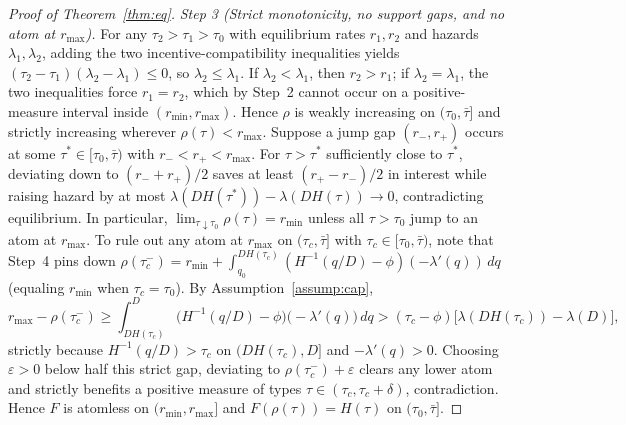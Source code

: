 \begin{proof}[Proof of Theorem~\ref{thm:eq}]
\emph{Step 3 (Strict monotonicity, no support gaps, and no atom at $r_{\max}$).} For any $\tau_2 > \tau_1 > \tau_0$ with equilibrium rates $r_1, r_2$ and hazards $\lambda_1, \lambda_2$, adding the two incentive-compatibility inequalities yields $(\tau_2 - \tau_1)(\lambda_2 - \lambda_1) \le 0$, so $\lambda_2 \le \lambda_1$. If $\lambda_2 < \lambda_1$, then $r_2 > r_1$; if $\lambda_2 = \lambda_1$, the two inequalities force $r_1 = r_2$, which by Step~2 cannot occur on a positive-measure interval inside $(r_{\min}, r_{\max})$. Hence $\rho$ is weakly increasing on $(\tau_0, \bar{\tau}]$ and strictly increasing wherever $\rho(\tau) < r_{\max}$. Suppose a jump gap $(r_-, r_+)$ occurs at some $\tau^* \in [\tau_0, \bar{\tau})$ with $r_- < r_+ < r_{\max}$. For $\tau > \tau^*$ sufficiently close to $\tau^*$, deviating down to $(r_- + r_+)/2$ saves at least $(r_+ - r_-)/2$ in interest while raising hazard by at most $\lambda(D H(\tau^*)) - \lambda(D H(\tau)) \to 0$, contradicting equilibrium. In particular, $\lim_{\tau \downarrow \tau_0} \rho(\tau) = r_{\min}$ unless all $\tau > \tau_0$ jump to an atom at $r_{\max}$. To rule out any atom at $r_{\max}$ on $(\tau_c, \bar{\tau}]$ with $\tau_c \in [\tau_0, \bar{\tau})$, note that Step~4 pins down $\rho(\tau_c^-) = r_{\min} + \int_{q_0}^{D H(\tau_c)} (H^{-1}(q/D) - \phi)(-\lambda'(q))\,dq$ (equaling $r_{\min}$ when $\tau_c = \tau_0$). By Assumption~\ref{assump:cap},
\[
r_{\max} - \rho(\tau_c^-) \ge \int_{D H(\tau_c)}^{D} \bigl(H^{-1}(q/D) - \phi\bigr)\bigl(-\lambda'(q)\bigr)\,dq > (\tau_c - \phi)\bigl[\lambda(D H(\tau_c)) - \lambda(D)\bigr],
\]
strictly because $H^{-1}(q/D) > \tau_c$ on $(D H(\tau_c), D]$ and $-\lambda'(q) > 0$. Choosing $\varepsilon > 0$ below half this strict gap, deviating to $\rho(\tau_c^-) + \varepsilon$ clears any lower atom and strictly benefits a positive measure of types $\tau \in (\tau_c, \tau_c + \delta)$, contradiction. Hence $F$ is atomless on $(r_{\min}, r_{\max}]$ and $F(\rho(\tau)) = H(\tau)$ on $(\tau_0, \bar{\tau}]$.


\end{proof}

